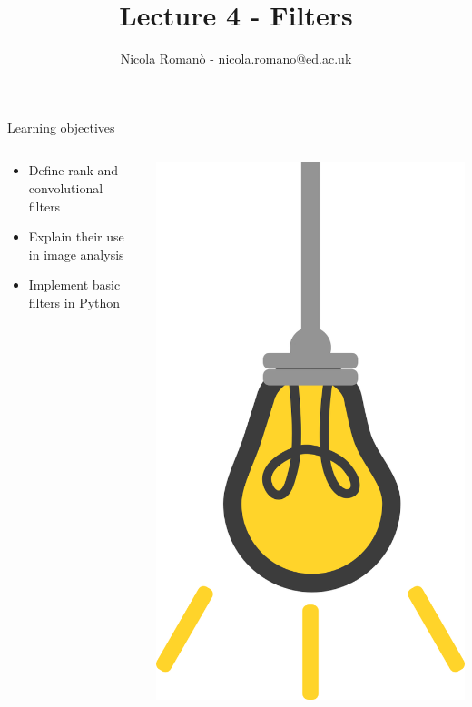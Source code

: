\documentclass[9pt, aspectratio=169]{beamer}
\author{Nicola Roman\`o - nicola.romano@ed.ac.uk}
\title{Lecture 4 - Filters}
\date{}
\begin{document}

\begin{frame}
    \titlepage
\end{frame}

\begin{frame}
    {Learning objectives}
    \begin{columns}
        \begin{column}{0.8\textwidth}
            \begin{itemize}
                \item Define rank and convolutional filters
                \item Explain their use in image analysis
                \item Implement basic filters in Python
            \end{itemize}
        \end{column}
        \begin{column}{0.2\textwidth}
            \includegraphics[angle=-30, origin=tr, width=1.5\textwidth]{lightbulb.png}

\end{column}
\end{columns}
\end{frame}
\end{document}
